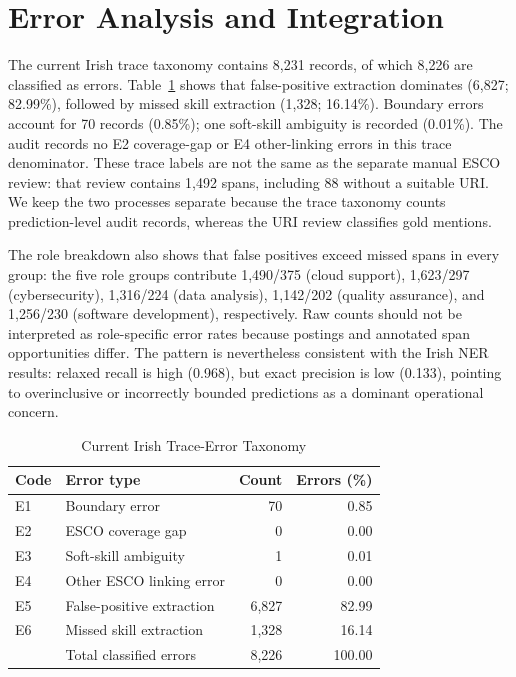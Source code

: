 \documentclass[conference]{IEEEtran}
\begin{document}
\section{Error Analysis and Integration}
The current Irish trace taxonomy contains 8,231 records, of which 8,226 are classified as errors. Table~\ref{tab:error-taxonomy} shows that false-positive extraction dominates (6,827; 82.99\%), followed by missed skill extraction (1,328; 16.14\%). Boundary errors account for 70 records (0.85\%); one soft-skill ambiguity is recorded (0.01\%). The audit records no E2 coverage-gap or E4 other-linking errors in this trace denominator. These trace labels are not the same as the separate manual ESCO review: that review contains 1,492 spans, including 88 without a suitable URI. We keep the two processes separate because the trace taxonomy counts prediction-level audit records, whereas the URI review classifies gold mentions.

The role breakdown also shows that false positives exceed missed spans in every group: the five role groups contribute 1,490/375 (cloud support), 1,623/297 (cybersecurity), 1,316/224 (data analysis), 1,142/202 (quality assurance), and 1,256/230 (software development), respectively. Raw counts should not be interpreted as role-specific error rates because postings and annotated span opportunities differ. The pattern is nevertheless consistent with the Irish NER results: relaxed recall is high (0.968), but exact precision is low (0.133), pointing to overinclusive or incorrectly bounded predictions as a dominant operational concern.

\begin{table}[!t]
\caption{Current Irish Trace-Error Taxonomy}
\label{tab:error-taxonomy}
\centering
\small
\begin{tabular}{llrr}
\toprule
Code & Error type & Count & Errors (\%) \\
\midrule
E1 & Boundary error & 70 & 0.85 \\
E2 & ESCO coverage gap & 0 & 0.00 \\
E3 & Soft-skill ambiguity & 1 & 0.01 \\
E4 & Other ESCO linking error & 0 & 0.00 \\
E5 & False-positive extraction & 6,827 & 82.99 \\
E6 & Missed skill extraction & 1,328 & 16.14 \\
\midrule
 & Total classified errors & 8,226 & 100.00 \\
\bottomrule
\end{tabular}
\\[1mm]
\par\vspace{1mm}{\footnotesize Percentages use the 8,226 classified errors; five additional trace records are marked correct. Source: current Irish trace audit.}
\end{table}
\end{document}
